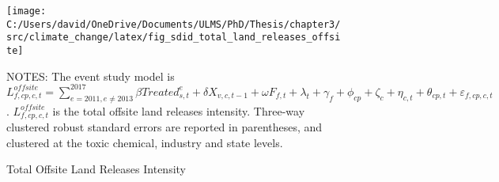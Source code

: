 \begin{figure}[H]
    \centering
    \texttt{[image: C:/Users/david/OneDrive/Documents/ULMS/PhD/Thesis/chapter3/src/climate\_change/latex/fig\_sdid\_total\_land\_releases\_offsite]}
    \caption{Total Offsite Land Releases Intensity}
    \label{fig:total-offsite-land-releases-intensity}
    \begin{minipage}{\columnwidth}
        \vspace{0.05in}
        \tiny NOTES: The event study model is $L_{f,cp,c,t}^{offsite} = \sum_{{e = 2011},{e \neq 2013}}^{2017} \beta Treated_{s,t}^e + \delta X_{v,c,t-1} + \omega F_{f,t} + \lambda_{t} + \gamma_{f} + \phi_{cp} + \zeta_{c} + \eta_{c,t} + \theta_{cp,t} + \varepsilon_{f,cp,c,t}$. $L_{f,cp,c,t}^{offsite}$ is the total offsite land releases intensity. Three-way clustered robust standard errors are reported in parentheses, and clustered at the toxic chemical, industry and state levels.
    \end{minipage}
\end{figure}